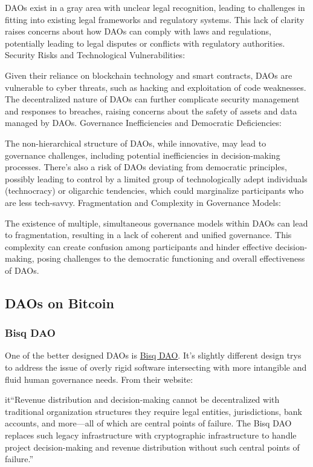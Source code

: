 DAOs exist in a gray area with unclear legal recognition, leading to challenges in fitting into existing legal frameworks and regulatory systems. This lack of clarity raises concerns about how DAOs can comply with laws and regulations, potentially leading to legal disputes or conflicts with regulatory authorities.
Security Risks and Technological Vulnerabilities:

Given their reliance on blockchain technology and smart contracts, DAOs are vulnerable to cyber threats, such as hacking and exploitation of code weaknesses. The decentralized nature of DAOs can further complicate security management and responses to breaches, raising concerns about the safety of assets and data managed by DAOs.
Governance Inefficiencies and Democratic Deficiencies:

The non-hierarchical structure of DAOs, while innovative, may lead to governance challenges, including potential inefficiencies in decision-making processes. There's also a risk of DAOs deviating from democratic principles, possibly leading to control by a limited group of technologically adept individuals (technocracy) or oligarchic tendencies, which could marginalize participants who are less tech-savvy.
Fragmentation and Complexity in Governance Models:

The existence of multiple, simultaneous governance models within DAOs can lead to fragmentation, resulting in a lack of coherent and unified governance. This complexity can create confusion among participants and hinder effective decision-making, posing challenges to the democratic functioning and overall effectiveness of DAOs.

\subsection{DAOs on Bitcoin}
\subsubsection{Bisq DAO}
One of the better designed DAOs is \href{https://bisq.network/dao/}{Bisq DAO}. It's slightly different design trys to address the issue of overly rigid software intersecting with more intangible and fluid human governance needs. From their website:\par
it{``Revenue distribution and decision-making cannot be decentralized with traditional organization structures they require legal entities, jurisdictions, bank accounts, and more—all of which are central points of failure.
The Bisq DAO replaces such legacy infrastructure with cryptographic infrastructure to handle project decision-making and revenue distribution without such central points of failure.''}
